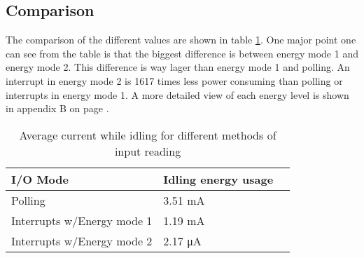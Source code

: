 \subsection{Comparison}

The comparison of the different values are shown in table \ref{tab:energy_usage}.
One major point one can see from the table is that the biggest difference is between energy mode 1 and energy mode 2. This difference is way lager than energy mode 1 and polling. An interrupt in energy mode 2 is 1617 times less power consuming than polling or interrupts in energy mode 1.
A more detailed view of each energy level is shown in appendix B on page \pageref{appendix:b}.

\begin{table}[ht!]
    \begin{center}
    \begin{tabular}{ | l | l | l | }
        \hline
        I/O Mode    & Idling energy usage \\
        \hline
        Polling & 3.51 mA \\
        \hline
        Interrupts w/Energy mode 1 & 1.19 mA \\
        \hline
        Interrupts w/Energy mode 2 & 2.17 \si{\micro\ampere} \\
        \hline
    \end{tabular}
    \caption{Average current while idling for different methods of input reading}
    \label{tab:energy_usage}
    \end{center}
\end{table}

